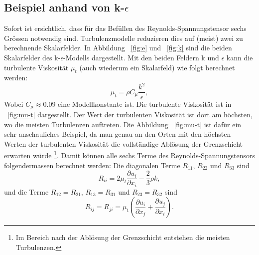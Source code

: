 \subsection{Beispiel anhand von k-$\epsilon$}
%
Sofort ist ersichtlich, dass für das Befüllen des Reynolds-Spannungstensor sechs Grössen notwendig sind.
Turbulenzmodelle reduzieren dies auf (meist) zwei zu berechnende Skalarfelder.
%
%
In Abbildung ~\ref{fig:e} und ~\ref{fig:k} sind die beiden Skalarfelder des k-$\epsilon$-Modells dargestellt.
Mit den beiden Feldern k und $\epsilon$ kann die turbulente Viskosität $\mu_t$ (auch wiederum ein Skalarfeld) wie
folgt berechnet werden:
%
\begin{equation}
    \label{eqs:Turbulent-Viscosity}
    \mu_t = \rho C_\mu \frac{k^2}{\epsilon},
\end{equation}
%
Wobei $C_\mu \approx 0.09$ eine Modellkonstante ist.
%
Die turbulente Viskosität ist in ~\ref{fig:mu-t} dargestellt.
Der Wert der turbulenten Viskosität ist dort am höchsten, wo die meisten Turbulenzen auftreten.
Die Abbildung ~\ref{fig:mu-t} ist dafür ein sehr anschauliches Beispiel,
da man genau an den Orten mit den höchsten Werten der turbulenten Viskosität die vollständige Ablösung
der Grenzschicht erwarten würde
\footnote{Im Bereich nach der Ablösung der Grenzschicht entstehen die meisten Turbulenzen.}.
%
Damit können alle sechs Terme des Reynolds-Spannungstensors folgendermassen berechnet werden:
%
Die diagonalen Terme $R_{11}$, $R_{22}$ und $R_{33}$ sind
%
\begin{equation}
    R_{ii} = 2 \mu_t \frac{\partial u_i}{\partial x_i} - \frac{2}{3}\rho k,
\end{equation}
%
und die Terme $R_{12} = R_{21}$, $R_{13} = R_{31}$ und $R_{23} = R_{32}$ sind
%
\begin{equation}
    R_{ij} = R_{ji} = \mu_t (\frac{\partial u_i}{\partial x_j} + \frac{\partial u_j}{\partial x_i}).
\end{equation}
%
